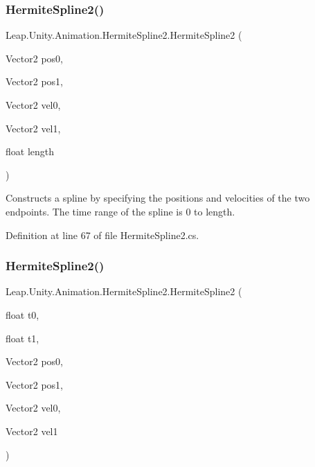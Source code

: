 \mbox{\label{struct_leap_1_1_unity_1_1_animation_1_1_hermite_spline2_a54a32a6e8f4c7a873beda463b5f61657}} 
\subsubsection{\texorpdfstring{HermiteSpline2()}{HermiteSpline2()}\hspace{0.1cm}{\footnotesize\ttfamily [3/4]}}
{\footnotesize\ttfamily Leap.\+Unity.\+Animation.\+Hermite\+Spline2.\+Hermite\+Spline2 (\begin{DoxyParamCaption}\item[{Vector2}]{pos0,  }\item[{Vector2}]{pos1,  }\item[{Vector2}]{vel0,  }\item[{Vector2}]{vel1,  }\item[{float}]{length }\end{DoxyParamCaption})}



Constructs a spline by specifying the positions and velocities of the two endpoints. The time range of the spline is 0 to length. 



Definition at line 67 of file Hermite\+Spline2.\+cs.

\mbox{\label{struct_leap_1_1_unity_1_1_animation_1_1_hermite_spline2_ab9e9d6ab0f7c366b3896e5905a405648}} 
\subsubsection{\texorpdfstring{HermiteSpline2()}{HermiteSpline2()}\hspace{0.1cm}{\footnotesize\ttfamily [4/4]}}
{\footnotesize\ttfamily Leap.\+Unity.\+Animation.\+Hermite\+Spline2.\+Hermite\+Spline2 (\begin{DoxyParamCaption}\item[{float}]{t0,  }\item[{float}]{t1,  }\item[{Vector2}]{pos0,  }\item[{Vector2}]{pos1,  }\item[{Vector2}]{vel0,  }\item[{Vector2}]{vel1 }\end{DoxyParamCaption})}



